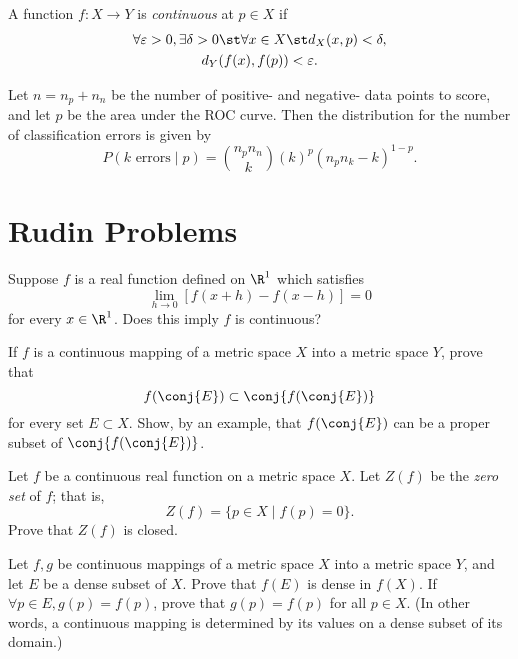\documentclass{assignment}
\begin{document}
\maketitle

\begin{question}[Continuity]
  A function $f: X\to Y$ is \emph{continuous} at $p\in X$ if 
\begin{gather*}
  \forall \varepsilon > 0, \exists \delta > 0 \st \forall x\in X \st d_X(x, p) < \delta, \\
d_Y(f(x), f(p)) < \varepsilon.
\end{gather*}
\end{question}

Let $n = n_p + n_n$ be the number of positive- and negative- data points to score, and let $p$ be the
area under the ROC curve. Then the distribution for the number of classification errors is given by
$$P(k \text{ errors} \mid p) = \binom{n_pn_n}{k} (k)^p(n_pn_k - k)^{1 - p}.$$

\section*{Rudin Problems}
\begin{question}[4.1]
  Suppose $f$ is a real function defined on $\R^1$ which satisfies $$\lim_{h\to 0} \left[ f(x + h) -
f(x - h) \right] = 0$$ for every $x\in\R^1$. Does this imply $f$ is continuous?
\end{question}

\begin{question}[4.2*]
 If $f$ is a continuous mapping of a metric space $X$ into a metric space $Y$, prove that
$$f(\conj{E}) \subset \conj{f(\conj{E})}$$ for every set $E \subset X$. Show, by an example, that
$f(\conj{E})$ can be a proper subset of $\conj{f(\conj{E})}$. 
\end{question}

\begin{question}[4.3]
 Let $f$ be a continuous real function on a metric space $X$. Let $Z(f)$ be the \emph{zero set} of
$f$; that is, $$Z(f) = \{ p\in X \mid f(p) = 0 \}.$$ Prove that $Z(f)$ is closed. 
\end{question}

\begin{question}[4.4*]
  Let $f,g$ be continuous mappings of a metric space $X$ into a metric space $Y$, and let $E$ be a
dense subset of $X$. Prove that $f(E)$ is dense in $f(X)$. If $\forall p\in E, g(p)= f(p)$, prove
that $g(p) = f(p)$ for all $p\in X$. (In other words, a continuous mapping is determined by its
values on a dense subset of its domain.)
\end{question}
\end{document}
